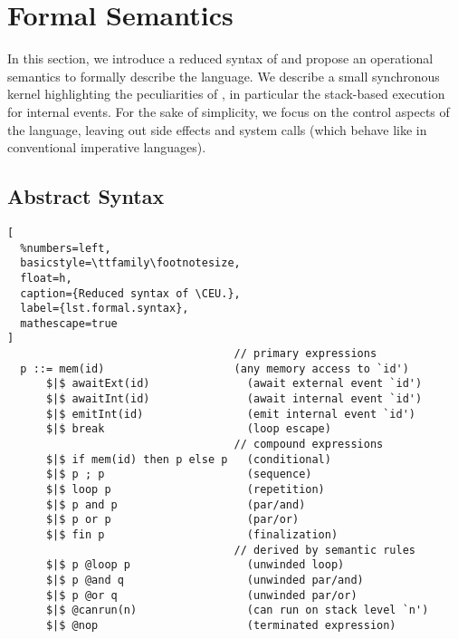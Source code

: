 \newcommand{\NST}{\1\xrightarrow[nst]\1}
\newcommand{\OUT}{\1\xrightarrow[out]\1}
\newcommand{\LL}{\langle}
\newcommand{\RR}{\rangle}
\newcommand{\DS}{\displaystyle}

\newcommand{\1}{\;}
\newcommand{\2}{\;\;}
\newcommand{\3}{\;\;\;}
\newcommand{\5}{\;\;\;\;\;}

\section{Formal Semantics}
\label{sec.sem}

%

In this section, we introduce a reduced syntax of \CEU and propose an 
operational semantics to formally describe the language.
We describe a small synchronous kernel highlighting the peculiarities of \CEU, 
in particular the stack-based execution for internal events.
%
For the sake of simplicity, we focus on the control aspects of the language, 
leaving out side effects and system calls (which behave like in conventional 
imperative languages).

\subsection{Abstract Syntax}
\label{sec.sem.syntax}

\begin{lstlisting}[
  %numbers=left,
  basicstyle=\ttfamily\footnotesize,
  float=h,
  caption={Reduced syntax of \CEU.},
  label={lst.formal.syntax},
  mathescape=true
]
                                   // primary expressions
  p ::= mem(id)                    (any memory access to `id')
      $|$ awaitExt(id)               (await external event `id')
      $|$ awaitInt(id)               (await internal event `id')
      $|$ emitInt(id)                (emit internal event `id')
      $|$ break                      (loop escape)
                                   // compound expressions
      $|$ if mem(id) then p else p   (conditional)
      $|$ p ; p                      (sequence)
      $|$ loop p                     (repetition)
      $|$ p and p                    (par/and)
      $|$ p or p                     (par/or)
      $|$ fin p                      (finalization)
                                   // derived by semantic rules
      $|$ p @loop p                  (unwinded loop)
      $|$ p @and q                   (unwinded par/and)
      $|$ p @or q                    (unwinded par/or)
      $|$ @canrun(n)                 (can run on stack level `n')
      $|$ @nop                       (terminated expression)
\end{lstlisting}

